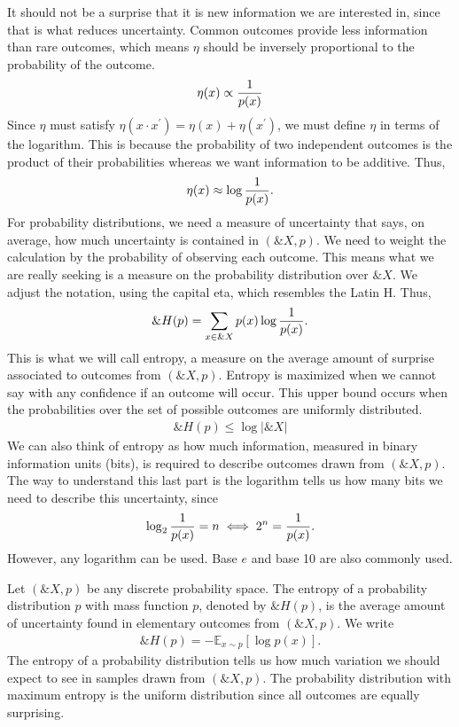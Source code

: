It should not be a surprise that it is new information we are interested in,
since that is what reduces uncertainty. Common outcomes provide less information
than rare outcomes, which means $\eta$ should be inversely proportional to the
probability of the outcome.
\begin{align}
  \label{eq:eta-1}
  \eta(x) \propto {1 \over p(x)}
\end{align}
Since $\eta$ must satisfy $\eta(x \cdot x^\prime) = \eta(x) + \eta(x^\prime)$,
we must define $\eta$ in terms of the logarithm. This is because the probability
of two independent outcomes is the product of their probabilities whereas we
want information to be additive.  Thus,
\begin{align}
  \label{eq:eta-3}
  \eta(x) \approx \log{1 \over p(x)}.
\end{align}
For probability distributions, we need a measure of uncertainty that says, on
average, how much uncertainty is contained in $(\&X, p)$. We need to weight the
calculation by the probability of observing each outcome. This means what we are
really seeking is a measure on the probability distribution over $\&X$. We
adjust the notation, using the capital eta, which resembles the Latin H. Thus,
\begin{align}
  \label{eq:eta-almost}
  \&H(p) = \sum_{x \in \&X} p(x) \log{1 \over p(x)}.
\end{align}
This is what we will call entropy, a measure on the average amount of surprise
associated to outcomes from $(\&X, p)$. Entropy is maximized when we cannot say
with any confidence if an outcome will occur. This upper bound occurs when the
probabilities over the set of possible outcomes are uniformly distributed.
\begin{align}
  \label{eq:eta-2}
  \&H(p) \leq \log{|\&X|}
\end{align}
We can also think of entropy as how much information, measured in binary
information units (bits), is required to describe outcomes drawn from $(\&X,
p)$. The way to understand this last part is the logarithm tells us how many
bits we need to describe this uncertainty, since
\begin{align}
  \label{eq:understand-log}
  \log_2{1 \over p(x)} = n \iff 2^n = {1 \over p(x)}.
\end{align}
However, any logarithm can be used. Base $e$ and base 10 are also commonly used.
\begin{definition}
  Let $(\&X, p)$ be any discrete probability space. The \textnormal{\sffamily
    entropy} of a probability distribution $p$ with mass function $p$, denoted
  by $\&H(p)$, is the average amount of uncertainty found in elementary outcomes
  from $(\&X, p)$. We write
  \begin{align}
    \label{eq:entropy}
    \&H(p) = - \mathbb{E}_{x \sim p} \left[ \log{p(x)} \right].
  \end{align}
  The entropy of a probability distribution tells us how much
  variation we should expect to see in samples drawn from $(\&X,
  p)$. The probability distribution with maximum entropy is the
  uniform distribution since all outcomes are equally surprising.
\end{definition}

